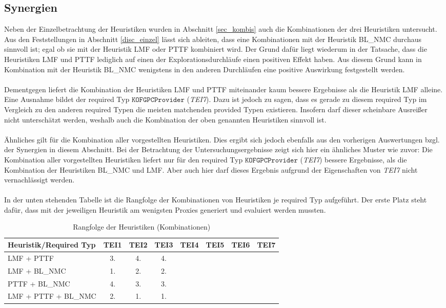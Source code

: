 \subsection{Synergien}
Neben der Einzelbetrachtung der Heuristiken wurden in Abschnitt \ref{sec_kombis} auch die Kombinationen der drei Heuristiken untersucht. Aus den Feststellungen in Abschnitt \ref{disc_einzel} lässt sich ableiten, dass eine Kombinationen mit der Heuristik BL\_NMC durchaus sinnvoll ist; egal ob sie mit der Heuristik LMF oder PTTF kombiniert wird. Der Grund dafür liegt wiederum in der Tatsache, dass die Heuristiken LMF und PTTF lediglich auf einen der Explorationsdurchläufe einen positiven Effekt haben. Aus diesem Grund kann in Kombination mit der Heuristik BL\_NMC wenigstens in den anderen Durchläufen eine positive Auswirkung festgestellt werden.
\\\\
Dementgegen liefert die Kombination der Heuristiken LMF und PTTF miteinander kaum bessere Ergebnisse als die Heuristik LMF alleine. Eine Ausnahme bildet der required Typ $\texttt{KOFGPCProvider}$ (\emph{TEI7}). Dazu ist jedoch zu sagen, dass es gerade zu diesem required Typ im Vergleich zu den anderen required Typen die meisten matchenden provided Typen existieren. Insofern darf dieser scheinbare Ausreißer nicht unterschätzt werden, weshalb auch die Kombination der oben genannten Heuristiken sinnvoll ist.
\\\\
Ähnliches gilt für die Kombination aller vorgestellten Heuristiken. Dies ergibt sich jedoch ebenfalls aus den vorherigen Auswertungen bzgl. der Synergien in diesem Abschnitt. Bei der Betrachtung der Untersuchungsergebnisse zeigt sich hier ein ähnliches Muster wie zuvor: Die Kombination aller vorgestellten Heuristiken liefert nur für den required Typ $\texttt{KOFGPCProvider}$ (\emph{TEI7}) bessere Ergebnisse, als die Kombination der Heuristiken BL\_NMC und LMF. Aber auch hier darf dieses Ergebnis aufgrund der Eigenschaften von \emph{TEI7} nicht vernachlässigt werden.
\\\\
In der unten stehenden Tabelle ist die Rangfolge der Kombinationen von Heuristiken je required Typ aufgeführt. Der erste Platz steht dafür, dass mit der jeweiligen Heuristik am wenigsten Proxies generiert und evaluiert werden mussten.
\begin{table}[!h]
\centering
\begin{tabular}{|l|c|c|c|c|c|c|c|}
\hline
\hline
\textbf{Heuristik/Required Typ} & \textbf{TEI1} & \textbf{TEI2}& \textbf{TEI3}& \textbf{TEI4}& \textbf{TEI5}& \textbf{TEI6}& \textbf{TEI7}\\
\hline
\hline
LMF + PTTF &3.&4.&4.&&&&\\
\hline
LMF + BL\_NMC &1. &2.&2.&&&& \\
\hline
PTTF + BL\_NMC &4. &3.&3.&&&& \\
\hline
LMF + PTTF + BL\_NMC &2. &1. &1. & &&&\\
\hline
\hline
\end{tabular}
\caption{Rangfolge der Heuristiken (Kombinationen)}
\end{table}
